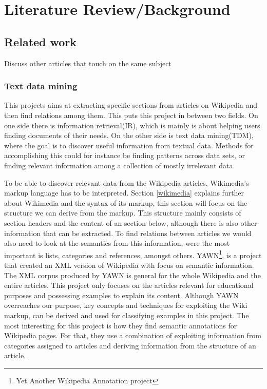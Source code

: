 
\chapter{Literature Review/Background}


\section{Related work}
Discuss other articles that touch on the same subject

\subsection{Text data mining}
This projects aims at extracting specific sections from articles on Wikipedia and then find relations among them. This puts this project in between two fields. On one side there is information retrieval(IR), which is mainly is about helping users finding documents of their needs\cite{irbook}. On the other side is text data mining(TDM), where the goal is to discover useful information from textual data. Methods for accomplishing this could for instance be finding patterns across data sets, or finding relevant information among a collection of mostly irrelevant data\cite{untanglingTDM}.

To be able to discover relevant data from the Wikipedia articles, Wikimedia's markup language has to be interpreted. Section \ref{wikimedia} explains further about Wikimedia and the syntax of its markup, this section will focus on the structure we can derive from the markup. This structure mainly consists of section headers and the content of an section below, although there is also other information that can be extracted. To find relations between articles we would also need to look at the semantics from this information, were the most important is lists, categories and references, amongst others. YAWN\footnote{Yet Another Wikipedia Annotation project}, is a project that created an XML version of Wikipedia with focus on semantic information\cite{yawn}. The XML corpus produced by YAWN is general for the whole Wikipedia and the entire articles. This project only focuses on the articles relevant for educational purposes and possessing examples to explain its content. Although YAWN overreaches our purpose, key concepts and techniques for exploiting the Wiki markup, can be derived and used for classifying examples in this project. The most interesting for this project is how they find semantic annotations for Wikipedia pages. For that, they use a combination of exploiting information from categories assigned to articles and deriving information from the structure of an article.

